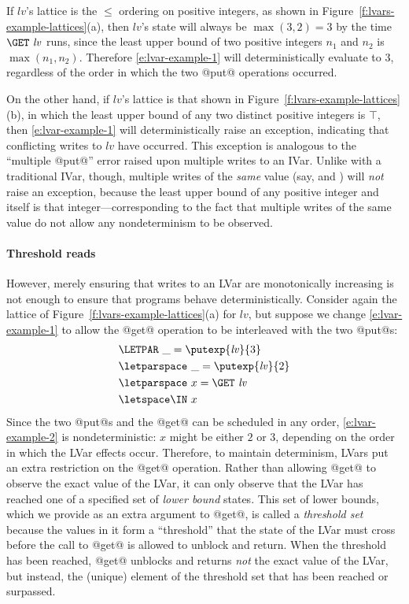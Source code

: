 If $\mathit{lv}$'s lattice is the $\leq$ ordering on positive
integers, as shown in Figure~\ref{f:lvars-example-lattices}(a), then
$\mathit{lv}$'s state will always be $\max(3, 2) = 3$ by the time
$\GET~\mathit{lv}$ runs, since the least upper bound of two positive
integers $n_1$ and $n_2$ is $\max(n_1, n_2)$.  Therefore
\ref{e:lvar-example-1} will deterministically evaluate to $3$,
regardless of the order in which the two @put@ operations occurred.

On the other hand, if $\mathit{lv}$'s lattice is that shown in
Figure~\ref{f:lvars-example-lattices}(b), in which the least upper
bound of any two distinct positive integers is $\top$, then
\ref{e:lvar-example-1} will deterministically raise an exception,
indicating that conflicting writes to $\mathit{lv}$ have occurred.
This exception is analogous to the ``multiple @put@'' error raised
upon multiple writes to an IVar.  Unlike with a traditional IVar,
though, multiple writes of the \emph{same} value (say,
 and ) will \emph{not}
raise an exception, because the least upper bound of any positive
integer and itself is that integer---corresponding to the fact that
multiple writes of the same value do not allow any nondeterminism to
be observed.

\paragraph{Threshold reads}

However, merely ensuring that writes to an LVar are monotonically
increasing is not enough to ensure that programs behave
deterministically.  Consider again the lattice of
Figure~\ref{f:lvars-example-lattices}(a) for $\mathit{lv}$, but
suppose we change \ref{e:lvar-example-1} to allow the @get@ operation
to be interleaved with the two @put@s:
\begin{equation}
\begin{split}
& \LETPAR ~\_ = \putexp{\mathit{lv}}{3} \\
&  \letparspace ~\_ = \putexp{\mathit{lv}}{2} \\
&  \letparspace ~x = \GET~\mathit{lv} \\
&  \letspace \IN~x
\end{split}
\label{e:lvar-example-2}
\end{equation}
Since the two @put@s and the @get@ can be scheduled in any order,
\ref{e:lvar-example-2} is nondeterministic: $x$ might be either $2$ or
$3$, depending on the order in which the LVar effects occur.
Therefore, to maintain determinism, LVars put an extra restriction on
the @get@ operation.  Rather than allowing @get@ to observe the exact
value of the LVar, it can only observe that the LVar has reached one
of a specified set of \emph{lower bound} states.  This set of lower
bounds, which we provide as an extra argument to @get@, is called a
\emph{threshold set} because the values in it form a ``threshold''
that the state of the LVar must cross before the call to @get@ is
allowed to unblock and return.  When the threshold has been reached,
@get@ unblocks and returns \emph{not} the exact value of the LVar, but
instead, the (unique) element of the threshold set that has been
reached or surpassed.

